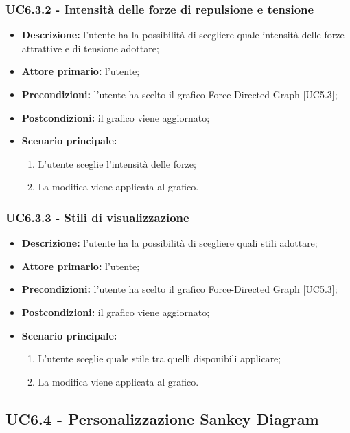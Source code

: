   \subsubsection{UC6.3.2 - Intensità delle forze di repulsione e tensione}
  \begin{itemize}
    \item \textbf{Descrizione:} l'utente ha la possibilità di scegliere quale intensità delle forze attrattive e di tensione adottare;
    \item \textbf{Attore primario:} l'utente;
    \item \textbf{Precondizioni:} l’utente ha scelto il grafico Force-Directed Graph [UC5.3];
    \item \textbf{Postcondizioni:} il grafico viene aggiornato;
    \item \textbf{Scenario principale:} 
      \begin{enumerate}
      \item L'utente sceglie l'intensità delle forze;
      \item La modifica viene applicata al grafico.
    \end{enumerate}
  \end{itemize}

  \subsubsection{UC6.3.3 - Stili di visualizzazione}
  \begin{itemize}
    \item \textbf{Descrizione:} l'utente ha la possibilità di scegliere quali stili adottare;
    \item \textbf{Attore primario:} l'utente;
    \item \textbf{Precondizioni:} l’utente ha scelto il grafico Force-Directed Graph [UC5.3];
    \item \textbf{Postcondizioni:} il grafico viene aggiornato;
    \item \textbf{Scenario principale:} 
     \begin{enumerate}
      \item L'utente sceglie quale stile tra quelli disponibili applicare;
      \item La modifica viene applicata al grafico.
    \end{enumerate}
  \end{itemize}


\subsection{UC6.4 - Personalizzazione Sankey Diagram}



